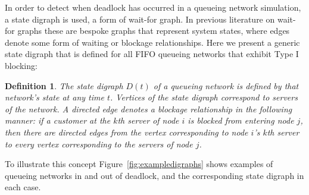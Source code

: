\documentclass{article}
\newtheorem{definition}{Definition}
\numberwithin{equation}{section}
\begin{document}
In order to detect when deadlock has occurred in a queueing network
simulation, a state digraph is used, a form of wait-for graph.
In previous literature on wait-for graphs these are bespoke graphs that
represent system states, where edges denote some form of waiting or blockage
relationships.
Here we present a generic state digraph that is defined for all FIFO
queueing networks that exhibit Type I blocking:\\


\begin{definition}\label{def:statedigraph}
The state digraph $D(t)$ of a queueing network is defined by that network's
state at any time $t$.
Vertices of the state digraph correspond to servers of the network.
A directed edge denotes a blockage relationship in the following manner: if a
customer at the $k$th server of node $i$ is blocked from entering node $j$,
then there are directed edges from the vertex corresponding to node $i$'s
$k$th server to every vertex corresponding to the servers of node $j$.
\end{definition}

To illustrate this concept Figure~\ref{fig:exampledigraphs} shows examples of
queueing networks in and out of deadlock, and the corresponding state digraph
in each case.
\end{document}
